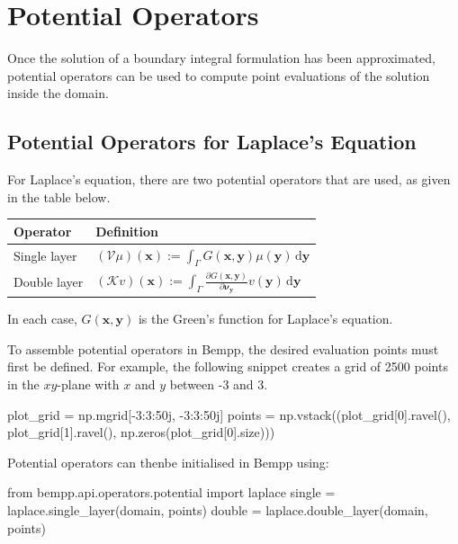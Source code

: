 \documentclass[a4paper]{book}
\begin{document}
\chapter{Potential Operators}


Once the solution of a boundary integral formulation has been approximated, potential
operators can be used to compute point evaluations of the solution inside the domain.


\section{Potential Operators for Laplace's Equation}

For Laplace's equation, there are two potential operators that are used, as given in the table
below.

\begin{center}
\begin{tabular}{|l|l|}
\hline
Operator             & Definition\\
\hline
Single layer         & $\displaystyle (\mathcal{V}\mu)(\mathbf{x}) := \int_{\Gamma} G(\mathbf{x},\mathbf{y}) \mu(\mathbf{y})\,\mathrm{d}\mathbf{y}$\\
Double layer         & $\displaystyle (\mathcal{K}v)(\mathbf{x}) := \int_{\Gamma} \frac{\partial G(\mathbf{x},\mathbf{y})}{\partial\mathbf{\nu}_{\mathbf{y}}} v(\mathbf{y})\,\mathrm{d}\mathbf{y}$\\
\hline
\end{tabular}
\end{center}

In each case, $G(\mathbf{x},\mathbf{y})$ is the Green's function for Laplace's equation.

To assemble potential operators in Bempp, the desired evaluation points must first be defined.
For example, the following snippet creates a grid of 2500 points in the $x$$y$-plane with
$x$ and $y$ between -3 and 3.

\begin{python}
plot_grid = np.mgrid[-3:3:50j, -3:3:50j]
points = np.vstack((plot_grid[0].ravel(),
                    plot_grid[1].ravel(),
                    np.zeros(plot_grid[0].size)))
\end{python}

Potential operators can thenbe initialised in Bempp using:
\begin{python}
from bempp.api.operators.potential import laplace
single = laplace.single_layer(domain, points)
double = laplace.double_layer(domain, points)
\end{python}
\end{document}
